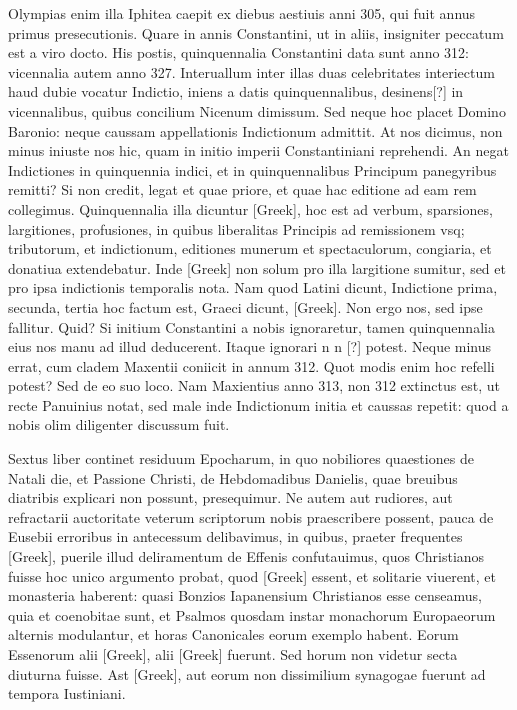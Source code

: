 Olympias enim illa Iphitea caepit ex diebus aestiuis
anni 305, qui fuit annus primus presecutionis.
Quare in annis
Constantini, ut in aliis, insigniter peccatum est a viro docto.
His
postis, quinquennalia Constantini data sunt anno 312: vicennalia
autem anno 327.
Interuallum inter illas duas celebritates interiectum
haud dubie vocatur Indictio, iniens a datis quinquennalibus,
desinens[?] in vicennalibus, quibus concilium Nicenum dimissum.
Sed neque hoc placet Domino Baronio: neque caussam appellationis
Indictionum admittit.
At nos dicimus, non minus iniuste nos
hic, quam in initio imperii Constantiniani reprehendi.
An negat
Indictiones in quinquennia indici, et in quinquennalibus Principum
panegyribus remitti?
Si non credit, legat et quae priore, et quae
hac editione ad eam rem collegimus.
Quinquennalia illa dicuntur
\textgreek{[Greek]}, hoc est ad verbum, sparsiones, largitiones, profusiones, in
quibus liberalitas Principis ad remissionem vsq; tributorum, et indictionum,
editiones munerum et spectaculorum, congiaria, et donatiua
extendebatur.
Inde \textgreek{[Greek]} non solum pro illa largitione
sumitur, sed et pro ipsa indictionis temporalis nota.
Nam quod Latini
dicunt, Indictione prima, secunda, tertia hoc factum est, Graeci
dicunt, \textgreek{[Greek]}.
Non ergo nos, sed ipse fallitur.
Quid?
Si initium Constantini a nobis ignoraretur, tamen quinquennalia
eius nos manu ad illud deducerent.
Itaque ignorari n n [?]
potest.
Neque minus errat, cum cladem Maxentii coniicit in annum
312.
Quot modis enim hoc refelli potest?
Sed de eo suo loco.
Nam
Maxientius anno 313, non 312 extinctus est, ut recte Panuinius notat,
sed male inde Indictionum initia et caussas repetit: quod a nobis
olim diligenter discussum fuit.

Sextus liber continet residuum Epocharum,
in quo nobiliores quaestiones de Natali die, et Passione Christi,
de Hebdomadibus Danielis, quae breuibus diatribis explicari
non possunt, presequimur.
Ne autem aut rudiores, aut refractarii auctoritate
veterum scriptorum nobis praescribere possent, pauca de
Eusebii erroribus in antecessum delibavimus, in quibus, praeter frequentes
\textgreek{[Greek]}, puerile illud deliramentum de Effenis confutauimus,
quos Christianos fuisse hoc unico argumento probat, quod
\textgreek{[Greek]} essent, et solitarie viuerent, et monasteria haberent:
quasi Bonzios
Iapanensium Christianos esse censeamus, quia et coenobitae sunt,
et Psalmos quosdam instar monachorum Europaeorum alternis modulantur,
et horas Canonicales eorum exemplo habent.
Eorum Essenorum alii \textgreek{[Greek]}, alii
 \textgreek{[Greek]} fuerunt.
Sed horum non videtur
secta diuturna fuisse.
{}
Ast \textgreek{[Greek]}, aut eorum non dissimilium
synagogae fuerunt ad tempora Iustiniani.

